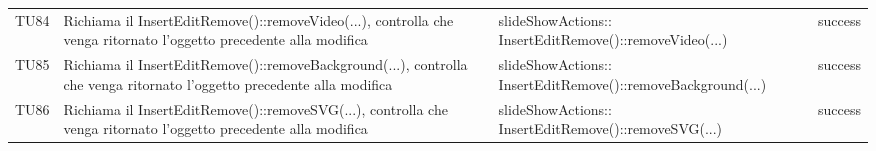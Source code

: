 \begin{longtable} [c]{| p{1cm} | p{6cm} | p{7cm} | p{1.5cm} |}
		 		 TU84 & Richiama il InsertEditRemove()::removeVideo(...), controlla che venga ritornato l'oggetto precedente alla modifica & slideShowActions:: InsertEditRemove()::removeVideo(...) & success \\
		 		 TU85 & Richiama il InsertEditRemove()::removeBackground(...), controlla che venga ritornato l'oggetto precedente alla modifica & slideShowActions:: InsertEditRemove()::removeBackground(...) & success \\
		 		 TU86 & Richiama il InsertEditRemove()::removeSVG(...), controlla che venga ritornato l'oggetto precedente alla modifica & slideShowActions:: InsertEditRemove()::removeSVG(...) & success \\
		 		 
		  		 \end{longtable}
 				 